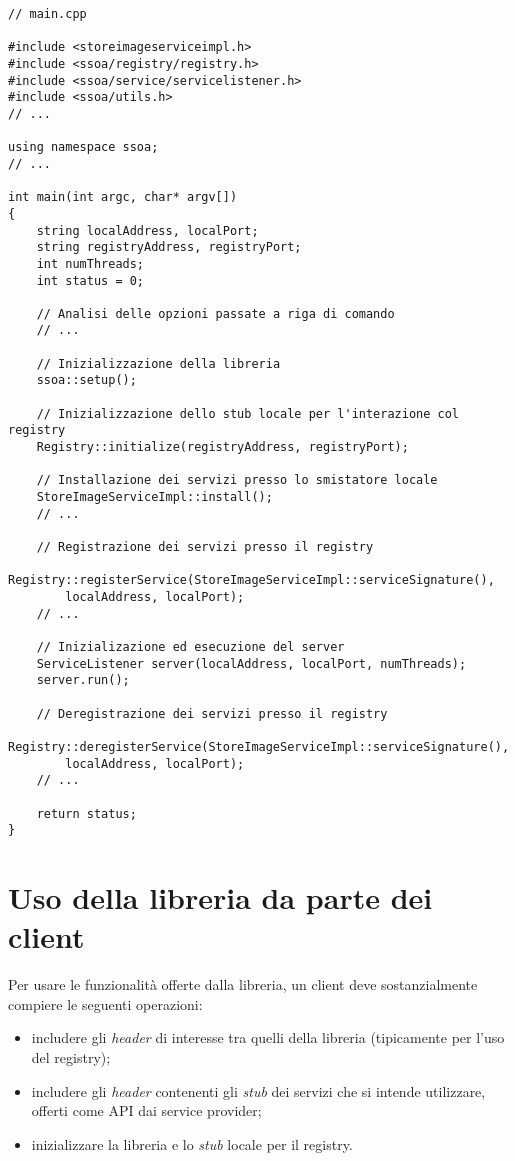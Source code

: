 \documentclass[a4paper,twoside]{article}
\begin{document}
\begin{lstlisting}
// main.cpp

#include <storeimageserviceimpl.h>
#include <ssoa/registry/registry.h>
#include <ssoa/service/servicelistener.h>
#include <ssoa/utils.h>
// ...

using namespace ssoa;
// ...

int main(int argc, char* argv[])
{
    string localAddress, localPort;
    string registryAddress, registryPort;
    int numThreads;
    int status = 0;

    // Analisi delle opzioni passate a riga di comando
    // ...

    // Inizializzazione della libreria
    ssoa::setup();

    // Inizializzazione dello stub locale per l'interazione col registry
    Registry::initialize(registryAddress, registryPort);

    // Installazione dei servizi presso lo smistatore locale
    StoreImageServiceImpl::install();
    // ...
    
    // Registrazione dei servizi presso il registry
    Registry::registerService(StoreImageServiceImpl::serviceSignature(),
        localAddress, localPort);
    // ...

    // Inizializazione ed esecuzione del server
    ServiceListener server(localAddress, localPort, numThreads);
    server.run();

    // Deregistrazione dei servizi presso il registry
    Registry::deregisterService(StoreImageServiceImpl::serviceSignature(),
        localAddress, localPort);
    // ...

    return status;
}
\end{lstlisting}


\section{Uso della libreria da parte dei client}

Per usare le funzionalità offerte dalla libreria, un client deve sostanzialmente compiere le seguenti operazioni:
\begin{itemize}
\item includere gli \emph{header} di interesse tra quelli della libreria (tipicamente per l'uso del registry);
\item includere gli \emph{header} contenenti gli \emph{stub} dei servizi che si intende utilizzare, offerti come API dai service provider;
\item inizializzare la libreria e lo \emph{stub} locale per il registry.
\end{itemize}
\end{document}
